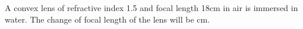 \item A convex lens of refractive index 1.5 and focal length 18cm in air is immersed in water. The change of focal length of the lens will be \underline{\hspace{2.5cm}} cm.
    \begin{center}
    \end{center}